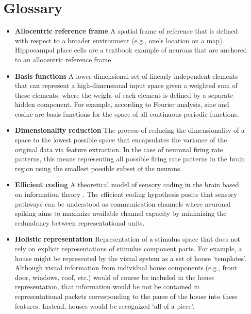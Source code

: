 \section*{Glossary}
\label{sec:Glossary}

\begin{itemize}
\item \textbf{Allocentric reference frame} A spatial frame of reference that is defined with respect to a broader environment (e.g., one's location on a map). Hippocampal place cells are a textbook example of neurons that are anchored to an allocentric reference frame.

\item \textbf{Basis functions} A lower-dimensional set of linearly independent elements that can represent a high-dimensional input space given a weighted sum of these elements, where the weight of each element is defined by a separate hidden component. For example, according to Fourier analysis, sine and cosine are basis functions for the space of all continuous periodic functions.

\item \textbf{Dimensionality reduction} The process of reducing the dimensionality of a space to the lowest possible space that encapsulates the variance of the original data via feature extraction. In the case of neuronal firing rate patterns, this means representing all possible firing rate patterns in the brain region using the smallest possible subset of the neurons.

\item \textbf{Efficient coding} A theoretical model of sensory coding in the brain based on information theory \cite{Barlow1961,Attneave1954,Linsker1990}. The efficient coding hypothesis posits that sensory pathways can be understood as communication channels where neuronal spiking aims to maximize available channel capacity by minimizing the redundancy between representational units.

\item \textbf{Holistic representation} Representation of a stimulus space that does not rely on explicit representations of stimulus component parts.
For example, a house might be represented by the visual system as a set of house
`templates'. Although visual information from individual house components
(e.g., front door, windows, roof, etc.) would of course be included in the house
representation, that information would be not be contained in representational
packets corresponding to the parse of the house into these features.
Instead, houses would be recognized `all of a piece'.


\end{itemize}

